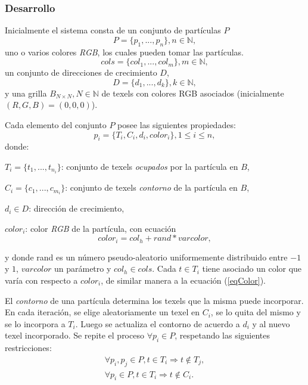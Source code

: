 \subsubsection{Desarrollo}
Inicialmente el sistema consta de un conjunto de part\'iculas $P$
\begin{equation}
P = \{p_{1}, ... , p_{n}\}, n  \in \mathbb{N},
\end{equation}
uno o varios colores {\em RGB}, los cuales pueden tomar las part\'iculas.
\begin{equation}
cols = \{col_{1}, ... , col_{m} \}, m \in \mathbb{N},
\end{equation}
un conjunto de direcciones de crecimiento $D$,
\begin{equation}
D = \{d_{1}, ... , d_{k} \}, k \in \mathbb{N},
\end{equation}
y una grilla $B_{N\times N}, N \in \mathbb{N} $ de texels con colores RGB asociados (inicialmente $(R,G,B)=(0,0,0)$).

Cada elemento del conjunto $P$ posee las siguientes propiedades:
\begin{equation}
p_{i} = \{T_{i}, C_{i}, d_{i}, color_{i}\}, 1 \le i \le n,
\end{equation}
donde:

$T_{i} = \{t_{1}, ... , t_{n_{i}}\}$: conjunto de texels {\em ocupados} por la part\'icula en $B$,

$C_{i} = \{c_{1}, ... , c_{m_{i}}\}$: conjunto de texels {\em contorno} de la part\'icula en $B$,

$d_{i} \in D$: direcci\'on de crecimiento,

$color_{i}$: color {\em RGB} de la part\'icula, con ecuaci\'on \cite{Reeves1983}
\begin{equation}
color_{i} = col_{h} + rand * varcolor,
\label{eqColor}
\end{equation}

\noindent
y donde rand es un n\'umero pseudo-aleatorio uniformemente distribuido entre $-1$ y $1$, $varcolor$ un par\'ametro y $col_{h} \in cols$.
Cada $t \in T_{i}$ tiene asociado un color que var\'ia con respecto a $color_{i}$, de similar manera a la ecuaci\'on (\ref{eqColor}).

El {\em contorno} de una part\'icula determina los texels que la misma puede incorporar. 
En cada iteraci\'on, se elige aleatoriamente un texel en $C_{i}$, se lo quita del mismo y se lo incorpora a $T_{i}$.
Luego se actualiza el contorno de acuerdo a $d_{i}$ y al nuevo texel incorporado.
Se repite el proceso $\forall p_{i} \in P$, respetando las siguientes restricciones:
\begin{eqnarray}
\forall p_{i}, p_{j} \in P, t \in T_{i} \Rightarrow t \notin T_{j}, \\
\forall p_{i} \in P, t \in T_{i} \Rightarrow t \notin C_{i}.
\end{eqnarray}

